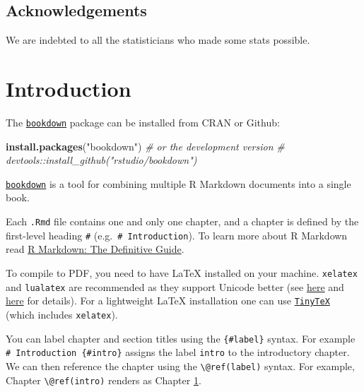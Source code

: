 \documentclass[
  oneside]{krantz}
\newenvironment{Shaded}{\begin{snugshade}}{\end{snugshade}}
\newcommand{\CommentTok}[1]{\textcolor[rgb]{0.56,0.35,0.01}{\textit{#1}}}
\newcommand{\KeywordTok}[1]{\textcolor[rgb]{0.13,0.29,0.53}{\textbf{#1}}}
\newcommand{\NormalTok}[1]{#1}
\newcommand{\StringTok}[1]{\textcolor[rgb]{0.31,0.60,0.02}{#1}}
\theoremstyle{definition}
\theoremstyle{definition}
\theoremstyle{definition}
\theoremstyle{remark}
\begin{document}
\hypertarget{acknowledgements}{%
\section*{Acknowledgements}\label{acknowledgements}}


We are indebted to all the statisticians who made some stats possible.

\hypertarget{intro}{%
\chapter{Introduction}\label{intro}}

The \href{https://bookdown.org/yihui/bookdown/}{\texttt{bookdown}} package can be installed from CRAN or Github:

\begin{Shaded}
\begin{Highlighting}[]
\KeywordTok{install.packages}\NormalTok{(}\StringTok{"bookdown"}\NormalTok{)}
\CommentTok{# or the development version}
\CommentTok{# devtools::install_github("rstudio/bookdown")}
\end{Highlighting}
\end{Shaded}

\href{https://bookdown.org/yihui/bookdown/}{\texttt{bookdown}} is a tool for combining multiple R Markdown documents into a single book.

Each \texttt{.Rmd} file contains one and only one chapter, and a chapter is defined by the first-level heading \texttt{\#} (e.g.~\texttt{\#\ Introduction}).
To learn more about R Markdown read \href{https://bookdown.org/yihui/rmarkdown/}{R Markdown: The Definitive Guide}.

To compile to PDF, you need to have LaTeX installed on your machine. \texttt{xelatex} and \texttt{lualatex} are recommended as they support Unicode better
(see \href{https://tex.stackexchange.com/questions/3393/what-is-xetex-exactly-and-why-should-i-use-it}{here} and \href{https://tex.stackexchange.com/questions/36/differences-between-luatex-context-and-xetex}{here} for details).
For a lightweight LaTeX installation one can use \href{https://yihui.org/tinytex/}{\texttt{TinyTeX}} (which includes \texttt{xelatex}).

You can label chapter and section titles using the \texttt{\{\#label\}} syntax. For example \texttt{\#\ Introduction\ \{\#intro\}} assigns the label \texttt{intro} to the introductory chapter.
We can then reference the chapter using the \texttt{\textbackslash{}@ref(label)} syntax. For example, Chapter \texttt{\textbackslash{}@ref(intro)} renders as Chapter \ref{intro}.
\end{document}

